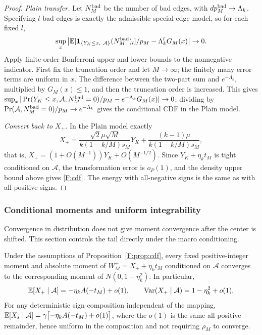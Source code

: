 \begin{proof}
\emph{Plain transfer.} Let $N^{\rm bad}_M$ be the number of bad edges, with
$dp_M^{\rm bad}\to\Lambda_k$. Specifying $l$ bad edges is exactly the admissible special-edge
model, so for each fixed $l$,
\[
\sup_x\left|\E[\mathbf1_{\{Y_K\le x,\ \mathcal A\}}(N^{\rm bad}_M)_l]/p_M-\Lambda_k^lG_M(x)\right|\to0.
\]
Apply finite-order Bonferroni upper and lower bounds to the nonnegative indicator. First fix the
truncation order and let $M\to\infty$; the finitely many error terms are uniform in $x$. The
difference between the two-part sum and $e^{-\Lambda_k}$, multiplied by $G_M(x)\le1$, and then
the truncation order is increased. This gives
$\sup_x|\Pr(Y_K\le x,\mathcal A,N^{\rm bad}_M=0)/p_M-e^{-\Lambda_k}G_M(x)|\to0$; dividing by
$\Pr(\mathcal A,N^{\rm bad}_M=0)/p_M\to e^{-\Lambda_k}$ gives the conditional CDF in the Plain
model.

\emph{Convert back to $X_+$.} In the Plain model exactly
\begin{equation}
X_+=\frac{\sqrt2\mu\sqrt M}{k(1-k/M)s_M}Y_K+\frac{(k-1)\mu}{k(1-k/M)s_M},\label{F:affine}
\end{equation}
that is, $X_+=(1+O(M^{-1}))Y_K+O(M^{-1/2})$. Since $Y_K+\eta_kt_M$ is tight conditioned on
$\mathcal A$, the transformation error is $o_P(1)$, and the density upper bound above gives
\eqref{F:cdf}. The energy with all-negative signs is the same as with all-positive signs.
\end{proof}

\subsubsection{Conditional moments and uniform integrability}

Convergence in distribution does not give moment convergence after the center is shifted. This
section controls the tail directly under the macro conditioning.

\begin{proposition}\label{F:prop:moments}
Under the assumptions of Proposition~\ref{F:prop:cdf}, every fixed positive-integer moment and
absolute moment of $W^+_M=X_++\eta_kt_M$ conditioned on $\mathcal A$ converges to the
corresponding moment of $N(0,1-\eta_k^2)$. In particular,
\begin{equation}
\mathbb E[X_+\mid \mathcal A]=-\eta_kA(-t_M)+o(1),\qquad\operatorname{Var}(X_+\mid \mathcal A)=1-\eta_k^2+o(1).\label{F:moments}
\end{equation}
For any deterministic sign composition independent of the mapping,
$\mathbb E[X_s\mid \mathcal A]=\gamma\bigl[-\eta_kA(-t_M)+o(1)\bigr]$, where the $o(1)$ is the same
all-positive remainder, hence uniform in the composition and not requiring $\rho_M$ to converge.
\end{proposition}

